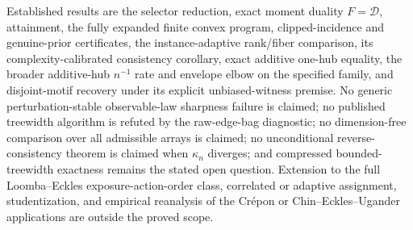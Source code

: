 \documentclass{article}
\begin{document}
Established results are the selector reduction, exact moment duality \(F=\mathcal D\), attainment, the fully expanded finite convex program, clipped-incidence and genuine-prior certificates, the instance-adaptive rank/fiber comparison, its complexity-calibrated consistency corollary, exact additive one-hub equality, the broader additive-hub \(n^{-1}\) rate and envelope elbow on the specified family, and disjoint-motif recovery under its explicit unbiased-witness premise. No generic perturbation-stable observable-law sharpness failure is claimed; no published treewidth algorithm is refuted by the raw-edge-bag diagnostic; no dimension-free comparison over all admissible arrays is claimed; no unconditional reverse-consistency theorem is claimed when \(\kappa_n\) diverges; and compressed bounded-treewidth exactness remains the stated open question. Extension to the full Loomba--Eckles exposure-action-order class, correlated or adaptive assignment, studentization, and empirical reanalysis of the Cr\'epon or Chin--Eckles--Ugander applications are outside the proved scope.
\end{document}
